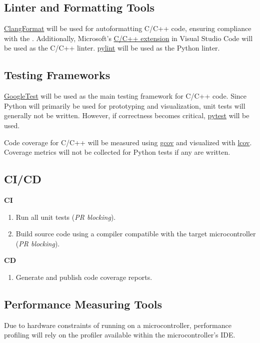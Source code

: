 \documentclass{article}
\begin{document}
\subsection{Linter and Formatting Tools}

\href{https://clang.llvm.org/docs/ClangFormat.html}{ClangFormat} will be used for autoformatting C/C++ code, ensuring compliance with the .
Additionally, Microsoft’s \href{https://code.visualstudio.com/docs/languages/cpp}{C/C++ extension} in Visual Studio Code will be used as the C/C++ linter.
\href{https://pypi.org/project/pylint/}{pylint} will be used as the Python linter.

\subsection{Testing Frameworks}
\href{https://github.com/google/googletest}{GoogleTest} will be used as the main testing framework for C/C++ code.
Since Python will primarily be used for prototyping and visualization, unit tests will generally not be written. However, if correctness becomes critical, \href{https://docs.pytest.org/}{pytest} will be used.

Code coverage for C/C++ will be measured using \href{https://gcc.gnu.org/onlinedocs/gcc/Gcov.html}{gcov} and visualized with \href{https://wiki.documentfoundation.org/Development/Lcov}{lcov}.
Coverage metrics will not be collected for Python tests if any are written.

\subsection{CI/CD}

\textbf{CI}
\begin{enumerate}
  \item Run all unit tests (\textit{PR blocking}).
  \item Build source code using a compiler compatible with the target microcontroller (\textit{PR blocking}).
\end{enumerate}
\textbf{CD} %
\begin{enumerate}
    \item Generate and publish code coverage reports.
\end{enumerate}

\subsection{Performance Measuring Tools}
Due to hardware constraints of running on a microcontroller, performance profiling will rely on the profiler available within the microcontroller’s IDE.
\end{document}
